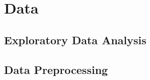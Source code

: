 \section{Data}
\cite{van2012designing}
\subsection{Exploratory Data Analysis}
\subsection{Data Preprocessing}
